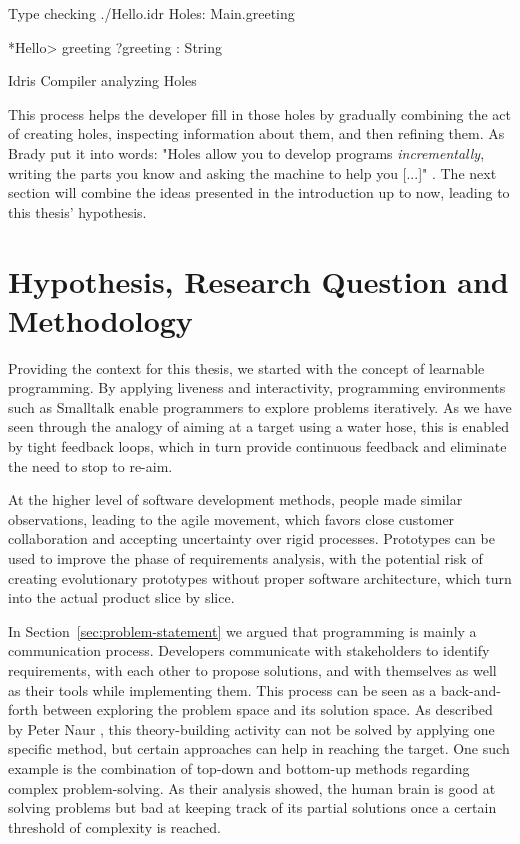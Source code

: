 \begin{program}
\begin{GenericCode}
Type checking ./Hello.idr
Holes: Main.greeting

*Hello> greeting
?greeting : String
\end{GenericCode}
\caption{Idris Compiler analyzing Holes}
\label{fig:idris-compiler-holes}
\end{program}

This process helps the developer fill in those holes by gradually combining the act of creating holes, inspecting information about them, and then refining them.
As Brady put it into words: "Holes allow you to develop programs \emph{incrementally}, writing the parts you know and asking the machine to help you [...]" \cite{brady_type-driven_2017}.
The next section will combine the ideas presented in the introduction up to now, leading to this thesis' hypothesis.


\section{Hypothesis, Research Question and Methodology}
\label{sec:hypothesis}
Providing the context for this thesis, we started with the concept of learnable programming.
By applying liveness and interactivity, programming environments such as Smalltalk enable programmers to explore problems iteratively.
As we have seen through the analogy of aiming at a target using a water hose, this is enabled by tight feedback loops, which in turn provide continuous feedback and eliminate the need to stop to re-aim.

At the higher level of software development methods, people made similar observations, leading to the agile movement, which favors close customer collaboration and accepting uncertainty over rigid processes.
Prototypes can be used to improve the phase of requirements analysis, with the potential risk of creating evolutionary prototypes without proper software architecture, which turn into the actual product slice by slice.

In Section~\ref{sec:problem-statement} we argued that programming is mainly a communication process.
Developers communicate with stakeholders to identify requirements, with each other to propose solutions, and with themselves as well as their tools while implementing them.
This process can be seen as a back-and-forth between exploring the problem space and its solution space.
As described by Peter Naur \cite{naur_programming_1985}, this theory-building activity can not be solved by applying one specific method, but certain approaches can help in reaching the target.
One such example is the combination of top-down and bottom-up methods regarding complex problem-solving.
As their analysis showed, the human brain is good at solving problems but bad at keeping track of its partial solutions once a certain threshold of complexity is reached.

